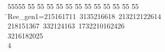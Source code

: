 %
%
\begin{tabbing}
55555 \= 55 \= 55 \= 55 \= 55 \= 55 \= 55 \= 55 \= 55 \= 55 \= 55 \= 55 \= 55 \= \>Ree\_gen1=215161711\ 3135216618\ 213212122614\ \\[0pt]
218151367\ 332124163\ 1732210162426\ \\[0pt]
3216182025\\[0pt]
4\>\end{tabbing}
